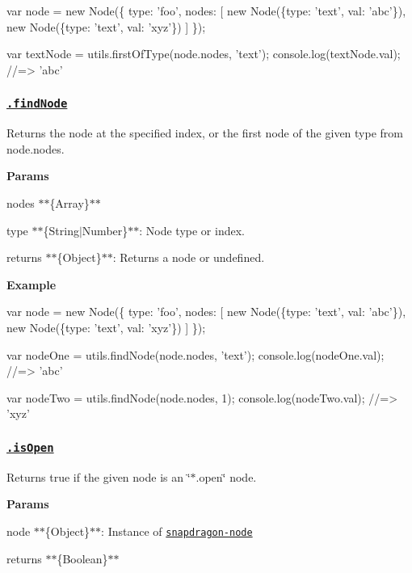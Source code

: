 \begin{DoxyCode}
var node = new Node(\{
  type: 'foo',
  nodes: [
    new Node(\{type: 'text', val: 'abc'\}),
    new Node(\{type: 'text', val: 'xyz'\})
  ]
\});

var textNode = utils.firstOfType(node.nodes, 'text');
console.log(textNode.val);
//=> 'abc'
\end{DoxyCode}


\subsubsection*{\href{index.js#L556}{\tt .find\+Node}}

Returns the node at the specified index, or the first node of the given {\ttfamily type} from {\ttfamily node.\+nodes}.

{\bfseries Params}


\begin{DoxyItemize}
\item {\ttfamily nodes} $\ast$$\ast$\{Array\}$\ast$$\ast$
\item {\ttfamily type} $\ast$$\ast$\{String$\vert$\+Number\}$\ast$$\ast$\+: Node type or index.
\item {\ttfamily returns} $\ast$$\ast$\{Object\}$\ast$$\ast$\+: Returns a node or undefined.
\end{DoxyItemize}

{\bfseries Example}


\begin{DoxyCode}
var node = new Node(\{
  type: 'foo',
  nodes: [
    new Node(\{type: 'text', val: 'abc'\}),
    new Node(\{type: 'text', val: 'xyz'\})
  ]
\});

var nodeOne = utils.findNode(node.nodes, 'text');
console.log(nodeOne.val);
//=> 'abc'

var nodeTwo = utils.findNode(node.nodes, 1);
console.log(nodeTwo.val);
//=> 'xyz'
\end{DoxyCode}


\subsubsection*{\href{index.js#L584}{\tt .is\+Open}}

Returns true if the given node is an \char`\"{}$\ast$.\+open\char`\"{} node.

{\bfseries Params}


\begin{DoxyItemize}
\item {\ttfamily node} $\ast$$\ast$\{Object\}$\ast$$\ast$\+: Instance of \href{https://github.com/jonschlinkert/snapdragon-node}{\tt snapdragon-\/node}
\item {\ttfamily returns} $\ast$$\ast$\{Boolean\}$\ast$$\ast$
\end{DoxyItemize}

